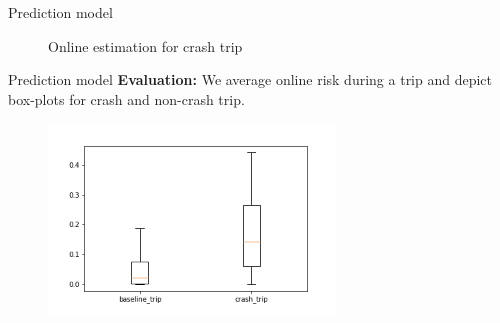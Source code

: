 \documentclass{beamer}
\begin{document}
{     \begin{frame}{Prediction model}
    	\begin{figure}[htbp]
    		\centering
    		\centering
    		\caption{Online estimation for crash trip}
    		\label{fig_crash_trip}
    	\end{figure}
    \end{frame}
    

    \begin{frame}{Prediction model}	
    	\textbf{Evaluation:} We average online risk during a trip and depict box-plots for  crash and non-crash trip.
        \begin{figure}[htbp]
        	\centering
        	\includegraphics[width=3.0in]{figs/risk_box}
        	\label{fig_box}
        \end{figure}
    \end{frame}
    
}
\end{document}
